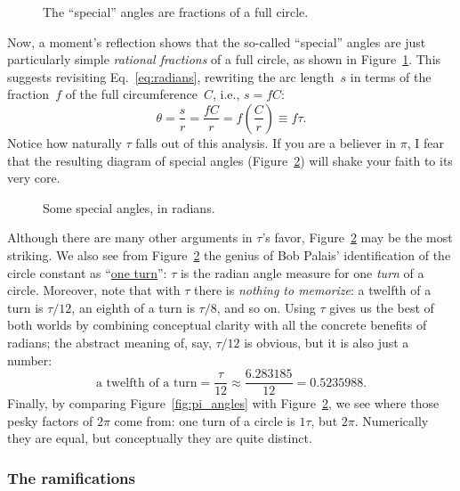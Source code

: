 \begin{figure}
\begin{center}
\end{center}
\caption{The ``special'' angles are fractions of a full circle.\label{fig:angle_fractions}}
\end{figure}

Now, a moment's reflection shows that the so-called ``special'' angles are just particularly simple \emph{rational fractions} of a full circle, as shown in Figure~\ref{fig:angle_fractions}. This suggests revisiting Eq.~\eqref{eq:radians}, rewriting the arc length~$s$ in terms of the fraction~$f$ of the full circumference~$C$, i.e., $s = f C$:
\[ \theta = \frac{s}{r} = \frac{fC}{r} =  f\left(\frac{C}{r}\right) \equiv f\tau. \]
 Notice how naturally $\tau$ falls out of this analysis. If you are a believer in $\pi$, I fear that the resulting diagram of special angles (Figure~\ref{fig:tau_angles}) will shake your faith to its very core.

\begin{figure}
\begin{center}
\end{center}
\caption{Some special angles, in radians.\label{fig:tau_angles}}
\end{figure}

Although there are many other arguments in $\tau$'s favor, Figure~\ref{fig:tau_angles} may be the most striking. We also see from Figure~\ref{fig:tau_angles} the genius of Bob Palais' identification of the circle constant as ``\href{https://en.wikipedia.org/wiki/Turn_(geometry)}{one turn}'': $\tau$ is the radian angle measure for one \emph{turn} of a circle. Moreover, note that with $\tau$ there is \emph{nothing to memorize}: a twelfth of a turn is $\tau/12$, an eighth of a turn is $\tau/8$, and so on. Using $\tau$ gives us the best of both worlds by combining conceptual clarity with all the concrete benefits of radians; the abstract meaning of, say, $\tau/12$ is obvious, but it is also just a number:
\[
  \mbox{a twelfth of a turn} = \frac{\tau}{12} \approx \frac{6.283185}{12} = 0.5235988.
\]
Finally, by comparing Figure~\ref{fig:pi_angles} with Figure~\ref{fig:tau_angles}, we see where those pesky factors of $2\pi$ come from: one turn of a circle is $1\tau$, but $2\pi$. Numerically they are equal, but conceptually they are quite distinct.

    \subsubsection{The ramifications} %
    \label{sec:the_ramifications}

